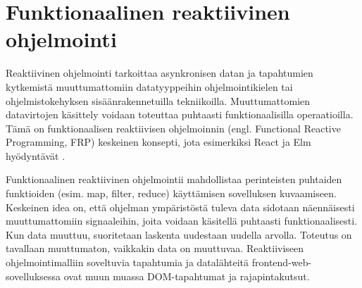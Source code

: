 \section{Funktionaalinen reaktiivinen ohjelmointi}
Reaktiivinen ohjelmointi tarkoittaa asynkronisen datan ja tapahtumien kytkemistä muuttumattomiin datatyyppeihin
ohjelmointikielen tai ohjelmistokehyksen sisäänrakennetuilla tekniikoilla. Muuttumattomien datavirtojen käsittely
voidaan toteuttaa puhtaasti funktionaalisilla operaatioilla. Tämä on funktionaalisen reaktiivisen ohjelmoinnin (engl.
Functional Reactive Programming, FRP) keskeinen konsepti, jota esimerkiksi React ja Elm hyödyntävät
\cite{elmlang}\cite{reactjs}. \cite{fpmattered}

Funktionaalinen reaktiivinen ohjelmointii mahdollistaa perinteisten puhtaiden funktioiden (esim. map, filter, reduce)
käyttämisen sovelluksen kuvaamiseen. Keskeinen idea on, että ohjelman ympäristöstä tuleva data sidotaan näennäisesti
muuttumattomiin signaaleihin, joita voidaan käsitellä puhtaasti funktionaalisesti. Kun data muuttuu, suoritetaan
laskenta uudestaan uudella arvolla. Toteutus on tavallaan muuttumaton, vaikkakin data on muuttuvaa. Reaktiiviseen
ohjelmointimalliin soveltuvia tapahtumia ja datalähteitä frontend-web-sovelluksessa ovat muun muassa DOM-tapahtumat ja
rajapintakutsut. \cite{elmlang}